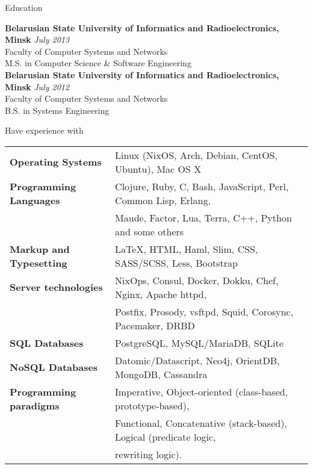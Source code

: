 \documentclass{resume} %
\begin{document}

\begin{rSection}{Education}

{\bf Belarusian State University of Informatics and Radioelectronics, Minsk} \hfill {\em July 2013} \\ 
Faculty of Computer Systems and Networks \\
M.S. in Computer Science \& Software Engineering \smallskip \\
{\bf Belarusian State University of Informatics and Radioelectronics, Minsk} \hfill {\em July 2012} \\ 
Faculty of Computer Systems and Networks \\
B.S. in Systems Engineering \\

\end{rSection}


\begin{rSection}{Have experience with}

\begin{tabular}{ @{} >{\bfseries}l @{\hspace{6ex}} l }
Operating Systems     & Linux (NixOS, Arch, Debian, CentOS, Ubuntu), Mac OS X \smallskip \\
Programming Languages & Clojure, Ruby, C, Bash, JavaScript, Perl, Common Lisp, Erlang, \\
                      & Maude, Factor, Lua, Terra, C++, Python and some others\smallskip \\
Markup and Typesetting & \LaTeX, HTML, Haml, Slim, CSS, SASS/SCSS, Less, Bootstrap \smallskip \\
Server technologies   & NixOps, Consul, Docker, Dokku, Chef, Nginx, Apache httpd, \\
                      & Postfix, Prosody, vsftpd, Squid, Corosync, Pacemaker, DRBD \smallskip \\
SQL Databases & PostgreSQL, MySQL/MariaDB, SQLite \smallskip \\
  NoSQL Databases & Datomic/Datascript, Neo4j, OrientDB, MongoDB, Cassandra \smallskip \\
Programming paradigms & Imperative, Object-oriented (class-based, prototype-based), \\
                      & Functional, Concatenative (stack-based), Logical (predicate logic, \\
                      & rewriting logic).
\end{tabular}

\end{rSection}
\end{document}
